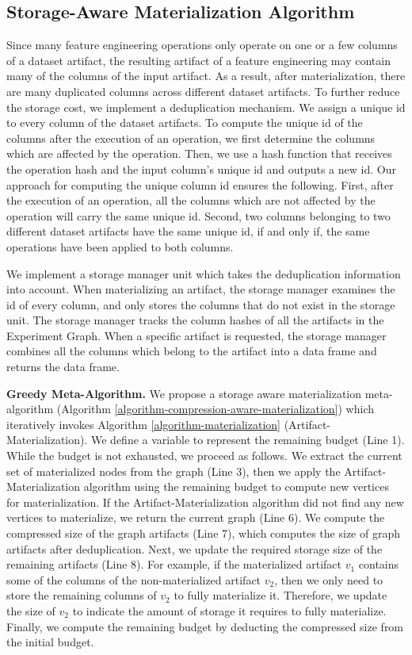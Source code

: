 \subsection{Storage-Aware Materialization Algorithm}
Since many feature engineering operations only operate on one or a few columns of a dataset artifact, the resulting artifact of a feature engineering may contain many of the columns of the input artifact.
As a result, after materialization, there are many duplicated columns across different dataset artifacts.
To further reduce the storage cost, we implement a deduplication mechanism.
We assign a unique id to every column of the dataset artifacts.
To compute the unique id of the columns after the execution of an operation, we first determine the columns which are affected by the operation.
Then, we use a hash function that receives the operation hash and the input column's unique id and outputs a new id.
Our approach for computing the unique column id ensures the following.
First, after the execution of an operation, all the columns which are not affected by the operation will carry the same unique id.
Second, two columns belonging to two different dataset artifacts have the same unique id, if and only if, the same operations have been applied to both columns.

We implement a storage manager unit which takes the deduplication information into account.
When materializing an artifact, the storage manager examines the id of every column, and only stores the columns that do not exist in the storage unit.
The storage manager tracks the column hashes of all the artifacts in the Experiment Graph.
When a specific artifact is requested, the storage manager combines all the columns which belong to the artifact into a data frame and returns the data frame.

\textbf{Greedy Meta-Algorithm.}
We propose a storage aware materialization meta-algorithm (Algorithm \ref{algorithm-compression-aware-materialization}) which iteratively invokes Algorithm \ref{algorithm-materialization} (Artifact-Materialization).
We define a variable to represent the remaining budget (Line 1).
While the budget is not exhausted, we proceed as follows.
We extract the current set of materialized nodes from the graph (Line 3), then we apply the Artifact-Materialization algorithm using the remaining budget to compute new vertices for materialization.
If the Artifact-Materialization algorithm did not find any new vertices to materialize, we return the current graph (Line 6).
We compute the compressed size of the graph artifacts (Line 7), which computes the size of graph artifacts after deduplication. 
Next, we update the required storage size of the remaining artifacts (Line 8).
For example, if the materialized artifact $v_1$ contains some of the columns of the non-materialized artifact $v_2$, then we only need to store the remaining columns of $v_2$ to fully materialize it.
Therefore, we update the size of $v_2$ to indicate the amount of storage it requires to fully materialize.
Finally, we compute the remaining budget by deducting the compressed size from the initial budget.

